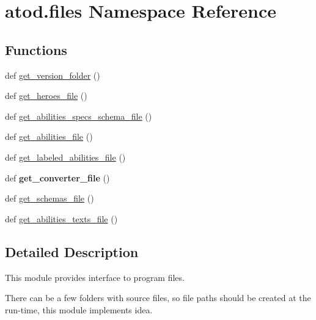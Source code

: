 \hypertarget{namespaceatod_1_1files}{}\section{atod.\+files Namespace Reference}
\label{namespaceatod_1_1files}
\subsection*{Functions}
\begin{DoxyCompactItemize}
\item 
def \hyperlink{namespaceatod_1_1files_a5a7f85ae1a4a86e521d73ce0f6e58793}{get\+\_\+version\+\_\+folder} ()
\item 
def \hyperlink{namespaceatod_1_1files_ade0ac674c88cbe72e25447b6709fc8df}{get\+\_\+heroes\+\_\+file} ()
\item 
def \hyperlink{namespaceatod_1_1files_a0f81c5ba30f606e7e037daea691f9d51}{get\+\_\+abilities\+\_\+specs\+\_\+schema\+\_\+file} ()
\item 
def \hyperlink{namespaceatod_1_1files_adb46b8fb420fab3bf4b0891ebbdf4260}{get\+\_\+abilities\+\_\+file} ()
\item 
def \hyperlink{namespaceatod_1_1files_a5bb1223fd6a3c8281c54ebd3eb596413}{get\+\_\+labeled\+\_\+abilities\+\_\+file} ()
\item 
def {\bfseries get\+\_\+converter\+\_\+file} ()\hypertarget{namespaceatod_1_1files_ace196d4c5fceb721f0abcd8f8005ec71}{}\label{namespaceatod_1_1files_ace196d4c5fceb721f0abcd8f8005ec71}

\item 
def \hyperlink{namespaceatod_1_1files_a35f094d575949cc90573ad3e877575b5}{get\+\_\+schemas\+\_\+file} ()
\item 
def \hyperlink{namespaceatod_1_1files_a460070e2d4bf8fe7b26e8a318a05c741}{get\+\_\+abilities\+\_\+texts\+\_\+file} ()
\end{DoxyCompactItemize}


\subsection{Detailed Description}
\begin{DoxyVerb}This module provides interface to program files.

There can be a few folders with source files, so file paths should be 
created at the run-time, this module implements idea.
\end{DoxyVerb}
 

